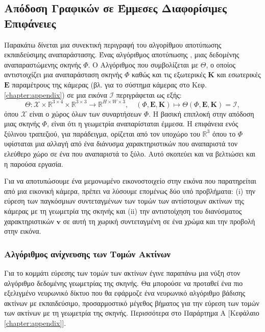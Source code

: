 \subsection{Απόδοση Γραφικών σε Έμμεσες Διαφορίσιμες Επιφάνειες}
\label{section:neuralImplicitRendering}
Παρακάτω δίνεται μια συνεκτική περιγραφή του αλγορίθμου αποτύπωσης εκπαιδεύσιμης αναπαράστασης.
Ένας αλγόριθμος αποτύπωσης \cite{sitzmann2020scene}, μιας δεδομένης αναπαραστώμενης  σκηνής $\Phi$. Ο Αλγόριθμος που συμβολίζεται με $\Theta$, ο οποίος αντιστοιχίζει μια αναπαράσταση σκηνής $\Phi$ καθώς και τις εξωτερικές $\mathbf{K}$ και εσωτερικές $\mathbf{E}$ παραμέτρους της κάμερας (βλ. για το σύστημα κάμερας στο Κεφ.\ref{chapter:appendix}) σε μια εικόνα $\mathcal{I}$ περιγράφεται ως εξής:
$$
\Theta: \mathcal{X} \times \mathbb{R}^{3 \times 4} \times \mathbb{R}^{3 \times 3} \rightarrow \mathbb{R}^{H \times W \times 3}, \quad(\Phi, \mathbf{E}, \mathbf{K}) \mapsto \Theta(\Phi, \mathbf{E}, \mathbf{K})=\mathcal{I},
$$
όπου $\mathcal{X}$ είναι ο χώρος όλων των συναρτήσεων $\Phi$.
Η βασική επιπλοκή στην απόδοση μιας σκηνής $\Phi$, είναι ότι η γεωμετρία αναπαρίσταται έμμεσα. Η επιφάνεια ενός ξύλινου τραπεζιού, για παράδειγμα, ορίζεται από τον υποχώρο του $\mathbb{R}^3$ όπου το $\Phi$ υφίσταται μια αλλαγή από ένα διάνυσμα χαρακτηριστικών που αναπαριστά τον ελεύθερο χώρο σε ένα που αναπαριστά το ξύλο. Αυτό σκοπεύει και να βελτιώσει και η παρούσα εργασία.

Για να αποτυπώσουμε ένα μεμονωμένο εικονοστοιχείο στην εικόνα που παρατηρείται από μια εικονική κάμερα, πρέπει να λύσουμε επομένως δύο υπό προβλήματα: (i) την εύρεση των παγκόσμιων συντεταγμένων των τομών των αντίστοιχων ακτίνων της κάμερας με τη γεωμετρία της σκηνής και (ii) την αντιστοίχηση του διανύσματος χαρακτηριστικών $\mathbf{v}$ σε αυτή τη χωρική συντεταγμένη σε ένα χρώμα και την προβολή στην εικόνα.

\subsubsection{Αλγόριθμος ανίχνευσης των Τομών Ακτίνων}
Για το κομμάτι εύρεσης των τομών των ακτίνων έγινε παραπάνω μια νύξη στον αλγόριθμο  δεδομένης γεωμετρίας της σκηνής. Θα μπορούσε να προταθεί ένα πιο εξελιγμένο νευρωνικό δίκτυο που θα εφάρμοζε ένα νευρωνικό αλγόριθμο βάδισης ακτίνων με εκπαιδεύσιμο, προσαρμοστικό μέγεθος βήματος για την εύρεση των τομών των ακτίνων με τη γεωμετρία της σκηνής. Περισσότερα στο Παράρτημα Α [Κεφάλαιο \ref{chapter:appendix}].

